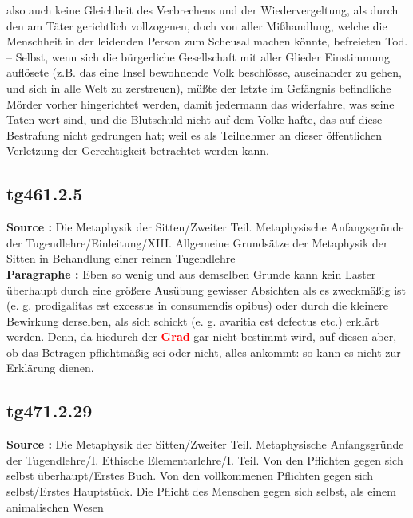 \documentclass[a4paper,12pt,twoside]{book}
\newcommand{\match}[1]{\textcolor{red}{\textbf{#1}}}
\begin{document}
also auch keine Gleichheit des Verbrechens und der Wiedervergeltung, als durch den am Täter gerichtlich vollzogenen, doch von aller Mißhandlung, welche die Menschheit in der leidenden Person zum Scheusal machen könnte, befreieten Tod. – Selbst, wenn sich die bürgerliche Gesellschaft mit aller Glieder Einstimmung auflösete (z.B. das eine Insel bewohnende Volk beschlösse, auseinander zu gehen, und sich in alle Welt zu zerstreuen), müßte der letzte im Gefängnis befindliche Mörder vorher hingerichtet werden, damit jedermann das widerfahre, was seine Taten wert sind, und die Blutschuld nicht auf dem Volke hafte, das auf diese Bestrafung nicht gedrungen hat; weil es als Teilnehmer an dieser öffentlichen Verletzung der Gerechtigkeit betrachtet werden kann. 
	
	\subsection*{tg461.2.5} 
	\textbf{Source : }Die Metaphysik der Sitten/Zweiter Teil. Metaphysische Anfangsgründe der Tugendlehre/Einleitung/XIII. Allgemeine Grundsätze der Metaphysik der Sitten in Behandlung einer reinen Tugendlehre\\  
	
	\textbf{Paragraphe : }Eben so wenig und aus demselben Grunde kann kein Laster überhaupt durch eine größere Ausübung gewisser Absichten als es zweckmäßig ist (e. g. prodigalitas est excessus in consumendis opibus) oder durch die kleinere Bewirkung derselben, als sich schickt (e. g. avaritia est defectus etc.) erklärt werden. Denn, da hiedurch der \match{Grad} gar nicht bestimmt wird, auf diesen aber, ob das Betragen pflichtmäßig sei oder nicht, alles ankommt: so kann es nicht zur Erklärung dienen. 
	
	\subsection*{tg471.2.29} 
	\textbf{Source : }Die Metaphysik der Sitten/Zweiter Teil. Metaphysische Anfangsgründe der Tugendlehre/I. Ethische Elementarlehre/I. Teil. Von den Pflichten gegen sich selbst überhaupt/Erstes Buch. Von den vollkommenen Pflichten gegen sich selbst/Erstes Hauptstück. Die Pflicht des Menschen gegen sich selbst, als einem animalischen Wesen\\  
	
\end{document}
